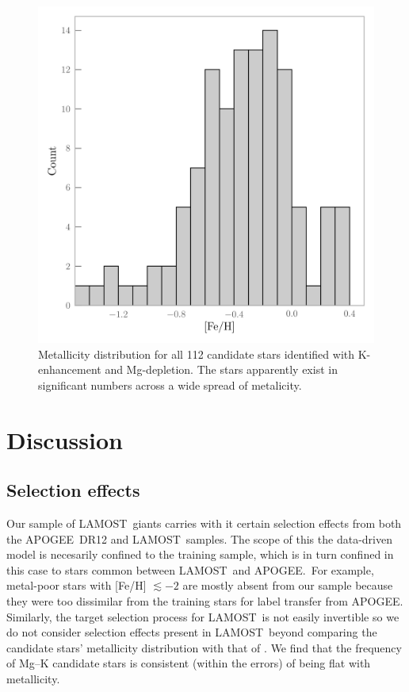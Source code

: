 \documentclass[a4paper,fleqn,usenatbib]{mnras}
\newcommand{\project}[1]{#1}
\newcommand{\lamost}{\project{LAMOST}}
\newcommand{\apogee}{\project{APOGEE}}
\begin{document}
\begin{figure}
	\includegraphics[width=\columnwidth]{mhist.png}
    \caption{Metallicity distribution for all 112 candidate stars identified with K-enhancement and Mg-depletion. The stars apparently exist in significant numbers across a wide spread of metalicity.}
    \label{mhist}
\end{figure}


\section{Discussion}
\label{sec:discussion}

\subsection{Selection effects}
\label{sec:selectioneffects}

Our sample of \lamost\ giants carries with it certain selection effects from both the \apogee\ DR12 and \lamost\ samples. The scope of this the data-driven model is necesarily confined to the training sample, which is in turn confined in this case to stars common between \lamost\ and \apogee.\ For example, metal-poor stars with [Fe/H] $\lesssim-2$ are mostly absent from our sample because they were too dissimilar from the training stars for label transfer from \apogee. Similarly, the target selection process for \lamost\ is not easily invertible so we do not consider selection effects present in \lamost\ beyond comparing the candidate stars' metallicity distribution with that of \cite{ho2017}. We find that the frequency of Mg--K candidate stars is consistent (within the errors) of being flat with metallicity. 
\end{document}
